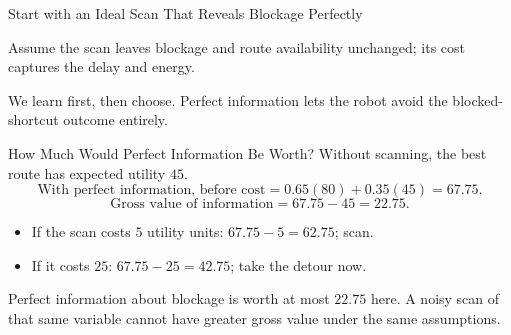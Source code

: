 \documentclass[aspectratio=169,10pt]{beamer}
\begin{document}
\begin{frame}{Start with an Ideal Scan That Reveals Blockage Perfectly}
  \begin{center}
  \end{center}
  Assume the scan leaves blockage and route availability unchanged; its cost captures the delay and energy.
  \begin{keyidea}
    We learn first, then choose. Perfect information lets the robot avoid the blocked-shortcut outcome entirely.
  \end{keyidea}
\end{frame}

\begin{frame}{How Much Would Perfect Information Be Worth?}
  Without scanning, the best route has expected utility $45$.
  \[
    \text{With perfect information, before cost}
      =0.65(80)+0.35(45)=67.75.
  \]
  \[
    \text{Gross value of information}=67.75-45=22.75.
  \]
  \begin{itemize}
    \item If the scan costs $5$ utility units: $67.75-5=62.75$; scan.
    \item If it costs $25$: $67.75-25=42.75$; take the detour now.
  \end{itemize}
  \begin{keyidea}
    Perfect information about blockage is worth at most $22.75$ here. A noisy scan of that same variable cannot have greater gross value under the same assumptions.
  \end{keyidea}
\end{frame}
\end{document}
